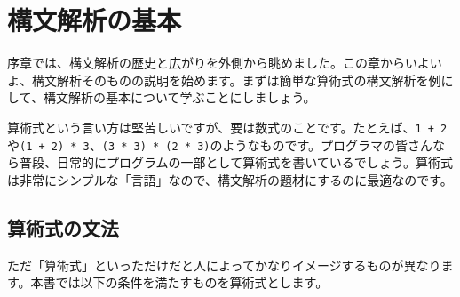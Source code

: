 \chapter{構文解析の基本}\label{ch01}

序章では、構文解析の歴史と広がりを外側から眺めました。この章からいよいよ、構文解析そのものの説明を始めます。まずは簡単な算術式の構文解析を例にして、構文解析の基本について学ぶことにしましょう。

算術式という言い方は堅苦しいですが、要は数式のことです。たとえば、\texttt{1\ +\ 2}や\texttt{(1\ +\ 2)\ *\ 3}、\texttt{(3\ *\ 3)\ *\ (2\ *\ 3)}のようなものです。プログラマの皆さんなら普段、日常的にプログラムの一部として算術式を書いているでしょう。算術式は非常にシンプルな「言語」なので、構文解析の題材にするのに最適なのです。

\section{算術式の文法}

ただ「算術式」といっただけだと人によってかなりイメージするものが異なります。本書では以下の条件を満たすものを算術式とします。

